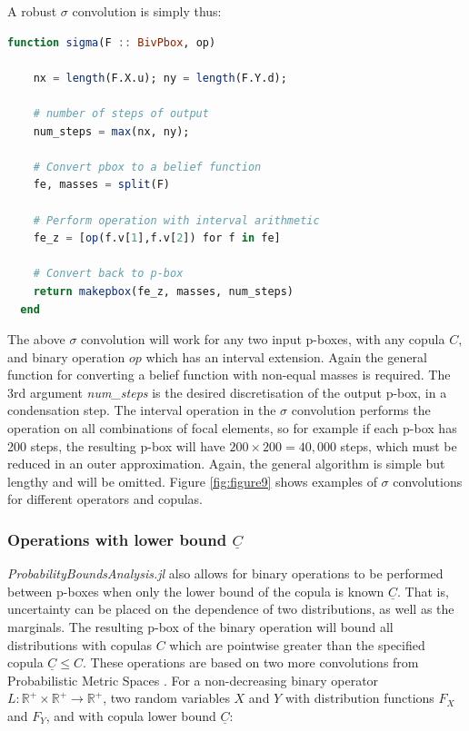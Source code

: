 \documentclass{juliacon}
\begin{document}
A robust $\sigma$ convolution is simply thus: 

\begin{lstlisting}[language = Julia]
  function sigma(F :: BivPbox, op)

    nx = length(F.X.u); ny = length(F.Y.d);

    # number of steps of output
    num_steps = max(nx, ny);
    
    # Convert pbox to a belief function
    fe, masses = split(F)

    # Perform operation with interval arithmetic
    fe_z = [op(f.v[1],f.v[2]) for f in fe]
    
    # Convert back to p-box
    return makepbox(fe_z, masses, num_steps)
  end
\end{lstlisting}

The above $\sigma$ convolution will work for any two input p-boxes, with any copula $C$, and binary operation $op$ which has an interval extension. Again the general function for converting a belief function with non-equal masses is required. The 3rd argument \textit{num\_steps} is the desired discretisation of the output p-box, in a condensation step. The interval operation in the $\sigma$ convolution performs the operation on all combinations of focal elements, so for example if each p-box has 200 steps, the resulting p-box will have $200 \times 200 = 40,000$ steps, which must be reduced in an outer approximation. Again, the general algorithm is simple but lengthy and will be omitted. Figure \ref{fig:figure9} shows examples of $\sigma$ convolutions for different operators and copulas.

\subsubsection{Operations with lower bound $\underline{C}$} \hfill \break

\textit{ProbabilityBoundsAnalysis.jl} also allows for binary operations to be performed between p-boxes when only the lower bound of the copula is known $\underline{C}$. That is, uncertainty can be placed on the dependence of two distributions, as well as the marginals. The resulting p-box of the binary operation will bound all distributions with copulas $C$ which are pointwise greater than the specified copula $\underline{C} \leq C$. These operations are based on two more convolutions from Probabilistic Metric Spaces \cite{schweizer2011probabilistic}. For a non-decreasing binary operator $L: \mathbb{R}^+\times \mathbb{R}^+ \to \mathbb{R}^+$, two random variables $X$ and $Y$ with distribution functions $F_X$ and $F_Y$, and with copula lower bound $\underline{C}$:
\end{document}
